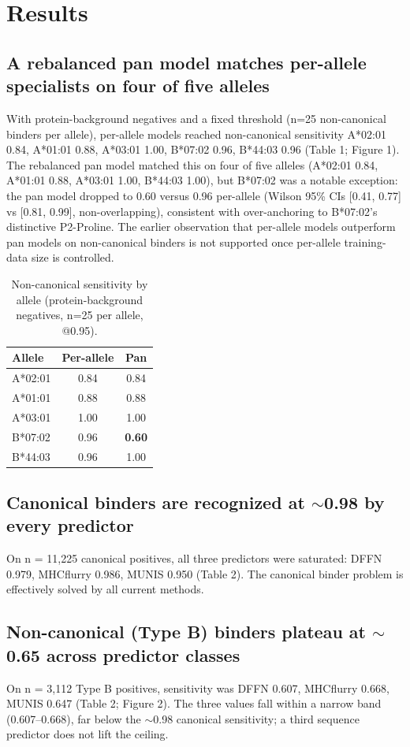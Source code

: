 \documentclass[10pt]{article}
\begin{document}
\section{Results}
\subsection{A rebalanced pan model matches per-allele specialists on four of five alleles}
With protein-background negatives and a fixed threshold (n=25 non-canonical binders per allele), per-allele models reached non-canonical sensitivity A*02:01 0.84, A*01:01 0.88, A*03:01 1.00, B*07:02 0.96, B*44:03 0.96 (Table 1; Figure 1). The rebalanced pan model matched this on four of five alleles (A*02:01 0.84, A*01:01 0.88, A*03:01 1.00, B*44:03 1.00), but B*07:02 was a notable exception: the pan model dropped to 0.60 versus 0.96 per-allele (Wilson 95\% CIs [0.41, 0.77] vs [0.81, 0.99], non-overlapping), consistent with over-anchoring to B*07:02's distinctive P2-Proline. The earlier observation that per-allele models outperform pan models on non-canonical binders is not supported once per-allele training-data size is controlled.

\begin{table}[h]
\centering
\caption{Non-canonical sensitivity by allele (protein-background negatives, n=25 per allele, @0.95).}
\begin{tabular}{@{}lcc@{}}
\toprule
Allele & Per-allele & Pan \\
\midrule
A*02:01 & 0.84 & 0.84 \\
A*01:01 & 0.88 & 0.88 \\
A*03:01 & 1.00 & 1.00 \\
B*07:02 & 0.96 & \textbf{0.60} \\
B*44:03 & 0.96 & 1.00 \\
\bottomrule
\end{tabular}
\end{table}

\subsection{Canonical binders are recognized at $\sim$0.98 by every predictor}
On n = 11,225 canonical positives, all three predictors were saturated: DFFN 0.979, MHCflurry 0.986, MUNIS 0.950 (Table 2). The canonical binder problem is effectively solved by all current methods.

\subsection{Non-canonical (Type B) binders plateau at $\sim$0.65 across predictor classes}
On n = 3,112 Type B positives, sensitivity was DFFN 0.607, MHCflurry 0.668, MUNIS 0.647 (Table 2; Figure 2). The three values fall within a narrow band (0.607--0.668), far below the $\sim$0.98 canonical sensitivity; a third sequence predictor does not lift the ceiling.
\end{document}

